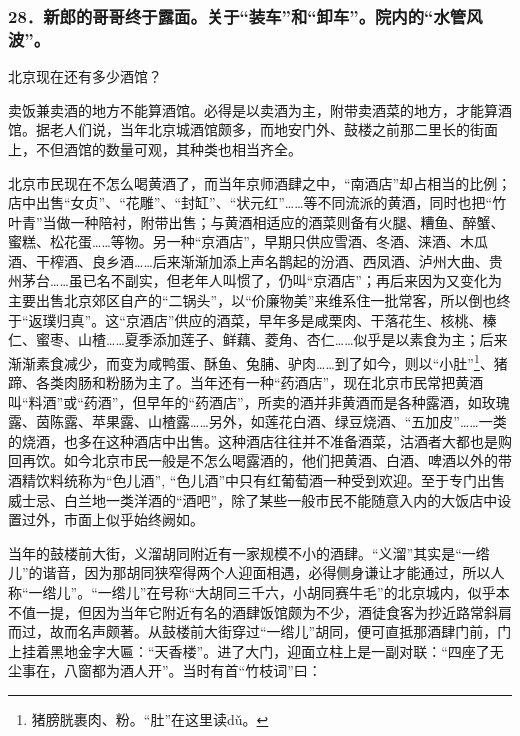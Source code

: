 \subsubsection*{28．新郎的哥哥终于露面。关于“装车”和“卸车”。院内的“水管风波”。}
\par 北京现在还有多少酒馆？
\par 卖饭兼卖酒的地方不能算酒馆。必得是以卖酒为主，附带卖酒菜的地方，才能算酒馆。据老人们说，当年北京城酒馆颇多，而地安门外、鼓楼之前那二里长的街面上，不但酒馆的数量可观，其种类也相当齐全。
\par 北京市民现在不怎么喝黄酒了，而当年京师酒肆之中，“南酒店”却占相当的比例；店中出售“女贞”、“花雕”、“封缸”、“状元红”……等不同流派的黄酒，同时也把“竹叶青”当做一种陪衬，附带出售；与黄酒相适应的酒菜则备有火腿、糟鱼、醉蟹、蜜糕、松花蛋……等物。另一种“京酒店”，早期只供应雪酒、冬酒、涞酒、木瓜酒、干榨酒、良乡酒……后来渐渐加添上声名鹊起的汾酒、西凤酒、泸州大曲、贵州茅台……虽已名不副实，但老年人叫惯了，仍叫“京酒店”；再后来因为又变化为主要出售北京郊区自产的“二锅头”，以“价廉物美”来维系住一批常客，所以倒也终于“返璞归真”。这“京酒店”供应的酒菜，早年多是咸栗肉、干落花生、核桃、榛仁、蜜枣、山楂……夏季添加莲子、鲜藕、菱角、杏仁……似乎是以素食为主；后来渐渐素食减少，而变为咸鸭蛋、酥鱼、兔脯、驴肉……到了如今，则以“小肚”\footnote{猪膀胱裹肉、粉。“肚”在这里读dǔ。}、猪蹄、各类肉肠和粉肠为主了。当年还有一种“药酒店”，现在北京市民常把黄酒叫“料酒”或“药酒”，但早年的“药酒店”，所卖的酒并非黄酒而是各种露酒，如玫瑰露、茵陈露、苹果露、山楂露……另外，如莲花白酒、绿豆烧酒、“五加皮”……一类的烧酒，也多在这种酒店中出售。这种酒店往往并不准备酒菜，沽酒者大都也是购回再饮。如今北京市民一般是不怎么喝露酒的，他们把黄酒、白酒、啤酒以外的带酒精饮料统称为“色儿酒”, “色儿酒”中只有红葡萄酒一种受到欢迎。至于专门出售威士忌、白兰地一类洋酒的“酒吧”，除了某些一般市民不能随意入内的大饭店中设置过外，市面上似乎始终阙如。
\par 当年的鼓楼前大街，义溜胡同附近有一家规模不小的酒肆。“义溜”其实是“一绺儿”的谐音，因为那胡同狭窄得两个人迎面相遇，必得侧身谦让才能通过，所以人称“一绺儿”。“一绺儿”在号称“大胡同三千六，小胡同赛牛毛”的北京城内，似乎本不值一提，但因为当年它附近有名的酒肆饭馆颇为不少，酒徒食客为抄近路常斜肩而过，故而名声颇著。从鼓楼前大街穿过“一绺儿”胡同，便可直抵那酒肆门前，门上挂着黑地金字大匾：“天香楼”。进了大门，迎面立柱上是一副对联：“四座了无尘事在，八窗都为酒人开”。当时有首“竹枝词”曰：
